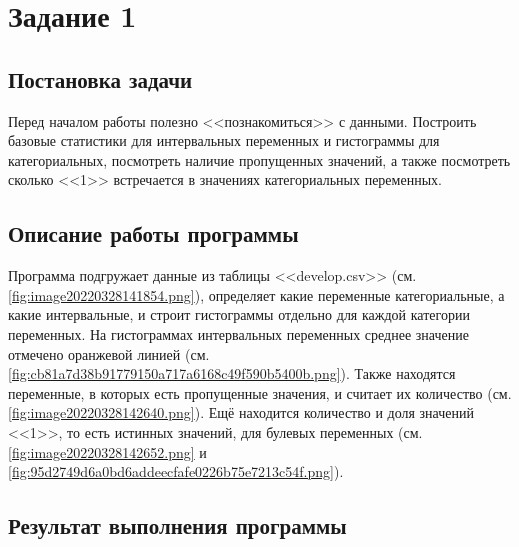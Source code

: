 \documentclass[12pt,a4paper]{article}
\begin{document}

  \section{Задание 1}
  \subsection{Постановка задачи}
  Перед началом работы полезно <<познакомиться>> с данными.
  Построить базовые статистики для интервальных переменных и гистограммы для категориальных,
  посмотреть наличие пропущенных значений, а также посмотреть сколько <<1>> встречается в значениях категориальных переменных.

  \subsection{Описание работы программы}
  Программа подгружает данные из таблицы <<develop.csv>> (см. \autoref{fig:image20220328141854.png}),
  определяет какие переменные категориальные, а какие интервальные, и строит гистограммы отдельно для каждой категории переменных.
  На гистограммах интервальных переменных среднее значение отмечено оранжевой линией
  (см. \autoref{fig:cb81a7d38b91779150a717a6168c49f590b5400b.png}).
  Также находятся переменные, в которых есть пропущенные значения, и считает их количество (см. \autoref{fig:image20220328142640.png}).
  Ещё находится количество и доля значений <<1>>, то есть истинных значений, для булевых переменных
  (см. \autoref{fig:image20220328142652.png} и \autoref{fig:95d2749d6a0bd6addeecfafe0226b75e7213c54f.png}).

  \subsection{Результат выполнения программы}
\end{document}
